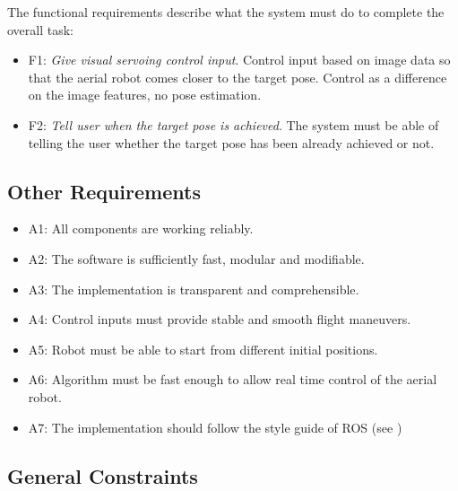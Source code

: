 The functional requirements describe what the system must do to complete the overall task:

\begin{itemize}
	\item F1: \emph{Give visual servoing control input}. Control input based on image data so that the aerial robot comes closer to the target pose. Control as a difference on the image features, no pose estimation.
	\item F2: \emph{Tell user when the target pose is achieved}. The system must be able of telling the user whether the target pose has been already achieved or not.
\end{itemize}

\subsection{Other Requirements}
\label{sec:other-requirements}

\begin{itemize}
	\item A1: All components are working reliably.
	\item A2: The software is sufficiently fast, modular and modifiable.
	\item A3: The implementation is transparent and comprehensible.
	\item A4: Control inputs must provide stable and smooth flight maneuvers.
	\item A5: Robot must be able to start from different initial positions.
	\item A6: Algorithm must be fast enough to allow real time control of the aerial robot.
	\item A7: The implementation should follow the style guide of ROS (see \cite{ROS_Style})
\end{itemize}

\subsection{General Constraints}
\label{sec:general-constraints}

